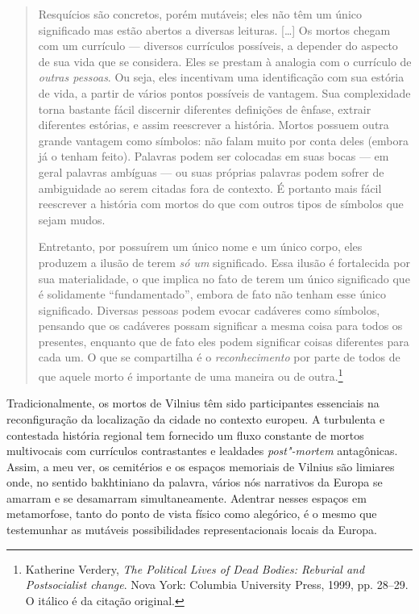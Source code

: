 \begin{quote}
Resquícios são concretos, porém mutáveis; eles não têm um único
significado mas estão abertos a diversas leituras. [\ldots{}] Os mortos chegam
com um currículo --- diversos currículos possíveis, a depender do aspecto
de sua vida que se considera. Eles se prestam à analogia com o currículo
de \textit{outras pessoas}. Ou seja, eles incentivam uma identificação com
sua estória de vida, a partir de vários pontos possíveis de vantagem.
Sua complexidade torna bastante fácil discernir diferentes definições de
ênfase, extrair diferentes estórias, e assim reescrever a história.
Mortos possuem outra grande vantagem como símbolos: não falam muito por
conta deles (embora já o tenham feito). Palavras podem ser colocadas em
suas bocas --- em geral palavras ambíguas --- ou suas próprias palavras
podem sofrer de ambiguidade ao serem citadas fora de contexto. É
portanto mais fácil reescrever a história com mortos do que com outros
tipos de símbolos que sejam mudos.

Entretanto, por possuírem um único nome e um único corpo, eles produzem
a ilusão de terem \textit{só um} significado. Essa ilusão é fortalecida
por sua materialidade, o que implica no fato de terem um único
significado que é solidamente ``fundamentado'', embora de fato não
tenham esse único significado. Diversas pessoas podem evocar cadáveres
como símbolos, pensando que os cadáveres possam significar a mesma coisa
para todos os presentes, enquanto que de fato eles podem significar
coisas diferentes para cada um. O que se compartilha é o
\textit{reconhecimento} por parte de todos de que aquele morto é
importante de uma maneira ou de outra.\footnote{Katherine Verdery, \textit{The Political Lives of Dead Bodies: Reburial and Postsocialist change}. Nova York: Columbia University Press, 1999, pp. 28--29. O itálico é da citação original.} 
\end{quote}

Tradicionalmente, os mortos de Vilnius têm sido participantes essenciais
na reconfiguração da localização da cidade no contexto europeu. A
turbulenta e contestada história regional tem fornecido um fluxo
constante de mortos multivocais com currículos contrastantes e lealdades
\textit{post"-mortem} antagônicas. Assim, a meu ver, os cemitérios e os
espaços memoriais de Vilnius são limiares onde, no sentido bakhtiniano
da palavra, vários nós narrativos da Europa se amarram e se desamarram
simultaneamente. Adentrar nesses espaços em metamorfose, tanto do ponto
de vista físico como alegórico, é o mesmo que testemunhar as mutáveis
possibilidades representacionais locais da Europa.

